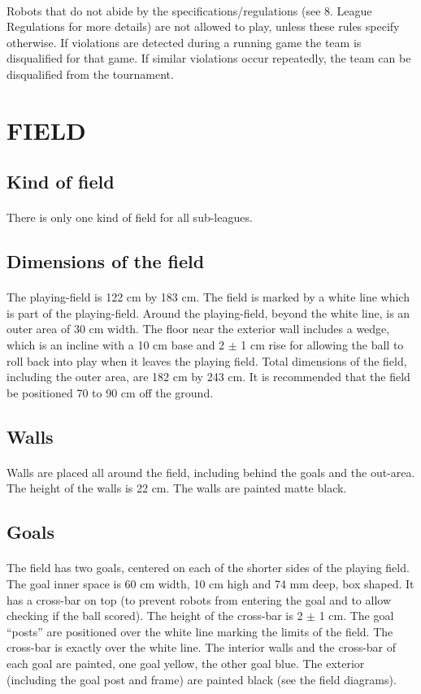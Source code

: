 \documentclass{article}
\newcommand*{\p}{\paragraph{}}
\begin{document}
\p Robots that do not abide by the specifications/regulations (see 8. League
Regulations for more details) are not allowed to play, unless these rules
specify otherwise. If violations are detected during a running game the team is
disqualified for that game. If similar violations occur repeatedly, the team
can be disqualified from the tournament.

\section{FIELD \label{ref-028}}

\subsection{Kind of field \label{ref-029}}

\p There is only one kind of field for all sub-leagues.

\subsection{ Dimensions of the field \label{ref-030}}

\p The playing-field is 122 cm by 183 cm. The field is marked by a white line
which is part of the playing-field. Around the playing-field, beyond the white
line, is an outer area of 30 cm width. The floor near the exterior wall
includes a wedge, which is an incline with a 10 cm base and
2 $\pm$ 1 cm rise for allowing the ball to roll back into play
when it leaves the playing field.  Total dimensions of the field, including the
outer area, are 182 cm by 243 cm.  It is recommended that the field be
positioned 70 to 90 cm off the ground.

\subsection{ Walls \label{ref-walls}}

\p Walls are placed all around the field, including behind the goals and the
out-area. The height of the walls is 22 cm. The walls are painted matte black.


\subsection{ Goals \label{ref-032}}

\p The field has two goals, centered on each of the shorter sides of the playing
field. The goal inner space is 60 cm width, 10 cm high and 74 mm deep, box
shaped. It has a cross-bar on top (to prevent robots from entering the goal and
to allow checking if the ball scored). The height of the cross-bar is 2
$\pm$ 1 cm. The goal ``posts'' are positioned over the white
line marking the limits of the field. The cross-bar is exactly over the white
line. The interior walls and the cross-bar of each goal are painted, one goal
yellow, the other goal blue. The exterior (including the goal post and frame)
are painted black (see the field diagrams).
\end{document}
